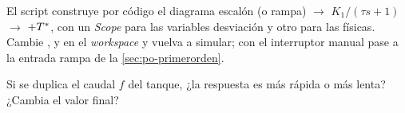 \begin{modelo}
El script  construye por código el diagrama escalón (o rampa) $\to$ $K_1/(\tau s+1)$ $\to$ $+T^{*}$, con un \emph{Scope} para las variables desviación y otro para las físicas. Cambie ,  y  en el \emph{workspace} y vuelva a simular; con el interruptor manual pase a la entrada rampa de la \cref{sec:po-primerorden}.
\end{modelo}

\begin{pausa}
Si se duplica el caudal $f$ del tanque, ¿la respuesta es más rápida o más lenta? ¿Cambia el valor final?
\end{pausa}

